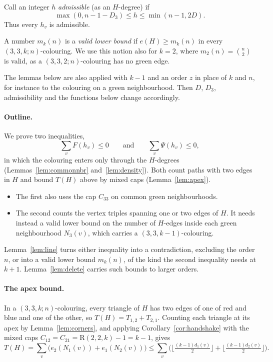 \documentclass[11pt]{article}
\theoremstyle{spacedplain}
\theoremstyle{spaceddef}
\theoremstyle{spacedremark}
\newcommand{\R}{\mathrm{R}}
\begin{document}
Call an integer $h$ \emph{admissible} (as an $H$-degree) if
\[
\max(0,n-1-D_3)\le h\le\min(n-1,2D).
\]
Thus every $h_v$ is admissible.

A number $m_k(n)$ is a \emph{valid lower bound} if $e(H)\ge m_k(n)$ in every $(3,3,k;n)$-colouring.
We use this notion also for $k=2$, where $m_2(n)=\binom n2$ is valid, as a $(3,3,2;n)$-colouring has no green edge.

The lemmas below are also applied with $k-1$ and an order $z$ in place of $k$ and $n$, for instance to the colouring on a green neighbourhood.
Then $D$, $D_3$, admissibility and the functions below change accordingly.

\paragraph{Outline.}
We prove two inequalities,
\[
\sum_vF(h_v)\le 0\qquad\text{and}\qquad\sum_v\Psi(h_v)\le 0,
\]
in which the colouring enters only through the $H$-degrees (Lemmas~\ref{lem:commonnbr} and~\ref{lem:density}).
Both count paths with two edges in $H$ and bound $T(H)$ above by mixed caps (Lemma~\ref{lem:apex}).
\begin{itemize}
\item The first also uses the cap $C_{33}$ on common green neighbourhoods.
\item The second counts the vertex triples spanning one or two edges of $H$.
It needs instead a valid lower bound on the number of $H$-edges inside each green neighbourhood $N_3(v)$, which carries a $(3,3,k-1)$-colouring.
\end{itemize}
Lemma~\ref{lem:line} turns either inequality into a contradiction, excluding the order $n$, or into a valid lower bound $m_k(n)$, of the kind the second inequality needs at $k+1$.
Lemma~\ref{lem:delete} carries such bounds to larger orders.

\paragraph{The apex bound.}
In a $(3,3,k;n)$-colouring, every triangle of $H$ has two edges of one of red and blue and one of the other, so $T(H)=T_{1,2}+T_{2,1}$.
Counting each triangle at its apex by Lemma~\ref{lem:corners}, and applying Corollary~\ref{cor:handshake} with the mixed caps $C_{12}=C_{21}=\R(2,2,k)-1=k-1$, gives
\[
T(H)=\sum_v\big(e_2(N_1(v))+e_1(N_2(v))\big)\le\sum_v\Big(\Big\lfloor\tfrac{(k-1)d_1(v)}{2}\Big\rfloor+\Big\lfloor\tfrac{(k-1)d_2(v)}{2}\Big\rfloor\Big).
\]
\end{document}
